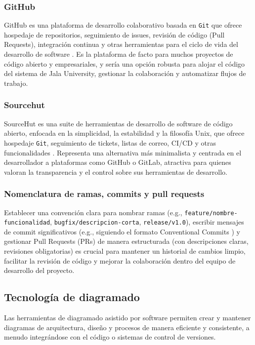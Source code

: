 \subsubsection{GitHub}
GitHub es una plataforma de desarrollo colaborativo basada en \texttt{Git} que ofrece hospedaje de repositorios, seguimiento de issues, revisión de código (Pull Requests), integración continua y otras herramientas para el ciclo de vida del desarrollo de software \parencite{GitHub}.
Es la plataforma de facto para muchos proyectos de código abierto y empresariales, y sería una opción robusta para alojar el código del sistema de Jala University, gestionar la colaboración y automatizar flujos de trabajo.

\subsubsection{Sourcehut}
SourceHut es una suite de herramientas de desarrollo de software de código abierto, enfocada en la simplicidad, la estabilidad y la filosofía Unix, que ofrece hospedaje \texttt{Git}, seguimiento de tickets, listas de correo, CI/CD y otras funcionalidades \parencite{SourceHut}.
Representa una alternativa más minimalista y centrada en el desarrollador a plataformas como GitHub o GitLab, atractiva para quienes valoran la transparencia y el control sobre sus herramientas de desarrollo.

\subsubsection{Nomenclatura de ramas, commits y pull requests}
Establecer una convención clara para nombrar ramas (e.g., \texttt{feature/nombre-funcionalidad}, \texttt{bugfix/descripcion-corta}, \texttt{release/v1.0}), escribir mensajes de commit significativos (e.g., siguiendo el formato Conventional Commits \parencite{ConventionalCommits}) y gestionar Pull Requests (PRs) de manera estructurada (con descripciones claras, revisiones obligatorias) es crucial para mantener un historial de cambios limpio, facilitar la revisión de código y mejorar la colaboración dentro del equipo de desarrollo del proyecto.

\subsection{Tecnología de diagramado}
Las herramientas de diagramado asistido por software permiten crear y mantener diagramas de arquitectura, diseño y procesos de manera eficiente y consistente, a menudo integrándose con el código o sistemas de control de versiones.

